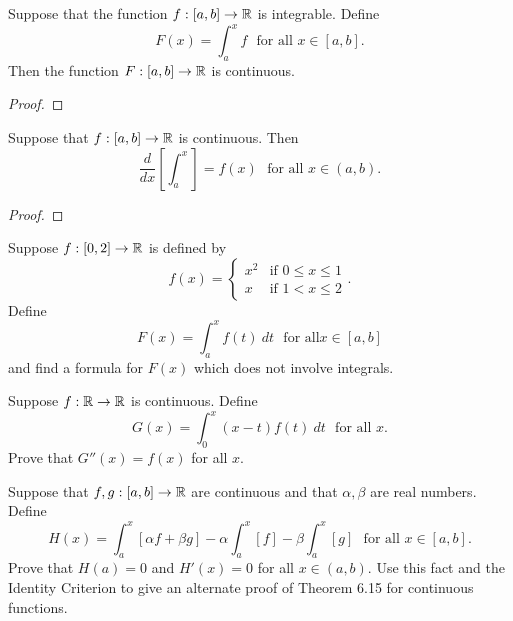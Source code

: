 \documentclass[letterpaper, twoside, 12pt]{book}
\begin{document}
\begin{proposition}[6.27]
  Suppose that the function \(f:[a,b]\to\mathbb R\) is integrable. Define
  \[
    F(x) = \int_a^x f
    \text{~~for all~} x\in[a,b]
  .\]
  Then the function \(F:[a,b]\to\mathbb R\) is continuous.
\end{proposition}
\begin{proof}

\end{proof}


\begin{theorem}
  Suppose that \(f:[a,b]\to\mathbb R\) is continuous. Then
  \[
    \frac{d}{dx}\left[\int_a^x\right]
      =
    f(x)
    \text{~~for all~} x\in(a,b)
  .\]
\end{theorem}
\begin{proof}

\end{proof}


\begin{exercise}[2b]
  Suppose \(f:[0,2]\to\mathbb R\) is defined by
  \[
    f(x) =
    \begin{cases}
      x^2 & \text{if } 0\leq x\leq 1 \\
      x   & \text{if } 1< x\leq 2
    \end{cases}
  .\]
  Define
  \[
    F(x)=\int_a^x f(t)~dt
    \text{~~for all} x\in[a,b]
  \]
  and find a formula for \(F(x)\) which does not involve integrals.
\end{exercise}
\begin{solution}

\end{solution}


\begin{exercise}[5]
  Suppose \(f:\mathbb R\to\mathbb R\) is continuous. Define
  \[
    G(x)
      =
    \int_0^x (x-t)f(t)~dt
    \text{~~for all~} x
  .\]
  Prove that \(G''(x)=f(x)\) for all \(x\).
\end{exercise}
\begin{solution}

\end{solution}


\begin{exercise}[12]
  Suppose that \(f,g:[a,b]\to\mathbb R\) are continuous and that \(\alpha,\beta\)
  are real numbers. Define
  \[
    H(x)
      =
    \int_a^x[\alpha f+\beta g]-\alpha\int_a^x[f]-\beta\int_a^x[g]
    \text{~~for all~} x\in[a,b]
  .\]
  Prove that \(H(a)=0\) and \(H'(x)=0\) for all \(x\in(a,b)\).
  Use this fact and the Identity Criterion to give an alternate proof of
  Theorem 6.15 for continuous functions.
\end{exercise}
\begin{solution}

\end{solution}
\end{document}

